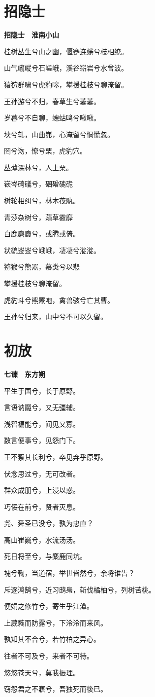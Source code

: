 \documentclass[12pt,a4paper]{ctexbook}
\begin{document}
\section{招隐士}
\textbf{招隐士　淮南小山}\par\vspace{0.5em}
桂树丛生兮山之幽，偃蹇连蜷兮枝相缭。\par
山气巄嵷兮石嵯峨，溪谷崭岩兮水曾波。\par
猿狖群啸兮虎豹嗥，攀援桂枝兮聊淹留。\par
王孙游兮不归，春草生兮萋萋。\par
岁暮兮不自聊，蟪蛄鸣兮啾啾。\par
坱兮轧，山曲岪，心淹留兮恫慌忽。\par
罔兮沕，憭兮栗，虎豹穴。\par
丛薄深林兮，人上栗。\par
嵚岑碕礒兮，碅磳磈硊\par
树轮相纠兮，林木茷骫。\par
青莎杂树兮，薠草靃靡\par
白鹿麏麚兮，或腾或倚。\par
状貌崟崟兮峨峨，凄凄兮漇漇。\par
猕猴兮熊罴，慕类兮以悲\par
攀援桂枝兮聊淹留。\par
虎豹斗兮熊罴咆，禽兽骇兮亡其曹。\par
王孙兮归来，山中兮不可以久留。\par

\section{初放}
\textbf{七谏　东方朔}\par\vspace{0.5em}
平生于国兮，长于原野。\par
言语讷譅兮，又无彊辅。\par
浅智褊能兮，闻见又寡。\par
数言便事兮，见怨门下。\par
王不察其长利兮，卒见弃乎原野。\par
伏念思过兮，无可改者。\par
群众成朋兮，上浸以惑。\par
巧佞在前兮，贤者灭息。\par
尧、舜圣已没兮，孰为忠直？\par
高山崔巍兮，水流汤汤。\par
死日将至兮，与麋鹿同坑。\par
塊兮鞠，当道宿，举世皆然兮，余将谁告？\par
斥逐鸿鹄兮，近习鸱枭，斩伐橘柚兮，列树苦桃。\par
便娟之修竹兮，寄生乎江潭。\par
上葳蕤而防露兮，下泠泠而来风。\par
孰知其不合兮，若竹柏之异心。\par
往者不可及兮，来者不可待。\par
悠悠苍天兮，莫我振理。\par
窃怨君之不寤兮，吾独死而後已。\par
\end{document}
